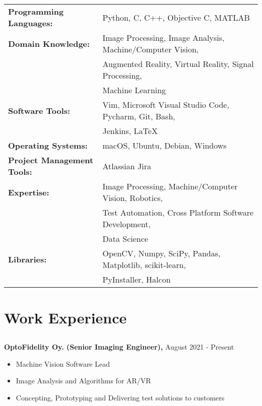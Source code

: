 \documentclass{article}
\begin{document}
\subsection{}
\begin{tabular}{l l}
  \textbf{Programming Languages:} & Python, C, C++, Objective C, MATLAB \\ [2pt]
  \textbf{Domain Knowledge:} & Image Processing, Image Analysis, Machine/Computer Vision, \\ 
                             & Augmented Reality, Virtual Reality, Signal Processing, \\
                             & Machine Learning \\ [2pt]
  \textbf{Software Tools:} & Vim, Microsoft Visual Studio Code, Pycharm, Git, Bash, \\
                           & Jenkins, LaTeX \\ [2pt]
  \textbf{Operating Systems:} & macOS, Ubuntu, Debian, Windows \\ [2pt]
  \textbf{Project Management Tools:} & Atlassian Jira \\ [2pt]
  \textbf{Expertise:} & Image Processing, Machine/Computer Vision, Robotics, \\
                      & Test Automation, Cross Platform Software Development, \\ 
                      & Data Science \\ [2pt]
  \textbf{Libraries:} & OpenCV, Numpy, SciPy, Pandas, Matplotlib, scikit-learn, \\
                      & PyInstaller, Halcon \\
\end{tabular}
\subsection{}

\section{Work Experience}
\subsection{}
\textbf{OptoFidelity Oy. (Senior Imaging Engineer),} August 2021 - Present
\begin{itemize}[leftmargin=0.75in]
  \item Machine Vision Software Lead
  \item Image Analysis and Algorithms for AR/VR
  \item Concepting, Prototyping and Delivering test solutions to customers

\end{itemize}
\end{document}
